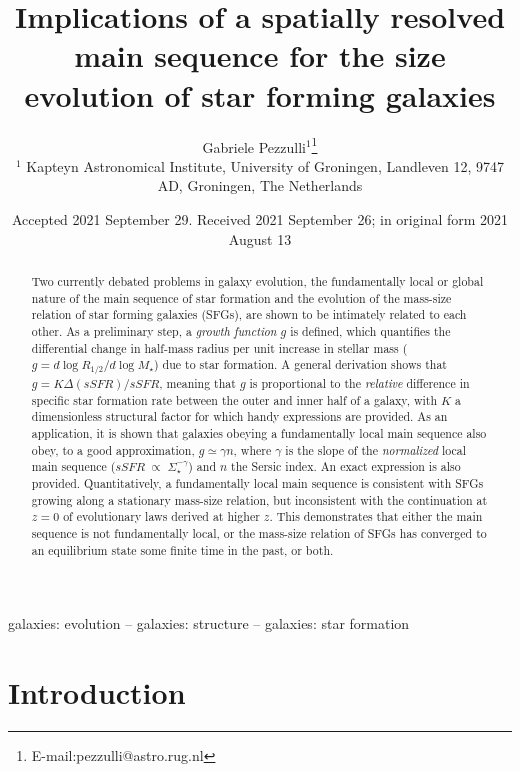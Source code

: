 \documentclass[fleqn,usenatbib]{mnras}
\title[Main sequence and radial growth]{Implications of a spatially resolved main sequence for the size evolution of star forming galaxies}
\author[G. Pezzulli]{Gabriele Pezzulli$^{1}$\thanks{E-mail:pezzulli@astro.rug.nl}\\
$^{1}$ Kapteyn Astronomical Institute, University of Groningen, Landleven 12, 9747 AD, Groningen, The Netherlands}
\date{Accepted 2021 September 29. Received 2021 September 26; in original form 2021 August 13}
\begin{document}
\label{firstpage}
\pagerange{\pageref{firstpage}--\pageref{lastpage}}
\maketitle




\begin{abstract}
\noindent
Two currently debated problems in galaxy evolution, the fundamentally local or global nature of the main sequence of star formation and the evolution of the mass-size relation of star forming galaxies (SFGs), are shown to be intimately related to each other. As a preliminary step, a \emph{growth function} $g$ is defined, which quantifies the differential change in half-mass radius per unit increase in stellar mass ($g = d \log R_{1/2}/d \log M_\star$) due to star formation. A general derivation shows that $g = K\Delta(sSFR)/sSFR$, meaning that $g$ is proportional to the \emph{relative} difference in specific star formation rate between the outer and inner half of a galaxy, with $K$ a dimensionless structural factor for which handy expressions are provided. As an application, it is shown that galaxies obeying a fundamentally local main sequence also obey, to a good approximation, $g \simeq \gamma n$, where $\gamma$ is the slope of the \emph{normalized} local main sequence ($sSFR \; \propto \; \Sigma_\star^{-\gamma}$) and $n$ the Sersic index. An exact expression is also provided. Quantitatively, a fundamentally local main sequence is consistent with SFGs growing along a stationary mass-size relation, but inconsistent with the continuation at $z=0$ of evolutionary laws derived at higher $z$. This demonstrates that either the main sequence is not fundamentally local, or the mass-size relation of SFGs has converged to an equilibrium state some finite time in the past, or both. \end{abstract}
\begin{keywords}
galaxies: evolution -- galaxies: structure -- galaxies: star formation
\end{keywords}



\section[Introduction]{Introduction}\label{sec:Introduction}
\end{document}
